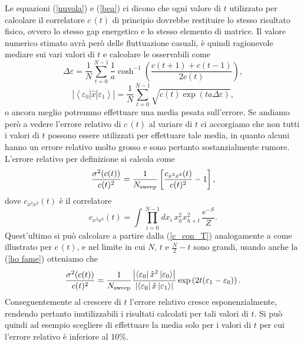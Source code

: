 \documentclass{article}
\begin{document}
Le equazioni (\ref{nuvola}) e (\ref{bea}) ci dicono che ogni valore di $t$ utilizzato per calcolare il correlatore $c\,(t)$ di principio dovrebbe restituire lo stesso risultato fisico, ovvero lo stesso gap energetico e lo stesso elemento di matrice. Il valore numerico stimato avrà però delle fluttuazione casuali, è quindi ragionevole mediare sui vari valori di $t$ e calcolare le osservabili come 
\begin{equation}
    \label{panca piana}
    \Delta\varepsilon=\frac{1}{N}\sum_{t=0}^{N-1}\frac{1}{a}\cosh^{-1}\left(\frac{c(t+1)+c(t-1)}{2c(t)}\right),
\end{equation} 
\begin{equation}
    \label{panca inclinata}
    \left|\left<\varepsilon_0\left|\hat{x}\right|\varepsilon_1\right>\right|=\frac{1}{N}\sum_{t=0}^{N-1}\sqrt{c(t)\exp{\left(ta\Delta\varepsilon\right)}},
\end{equation}
o ancora meglio potremmo effettuare una media pesata sull'errore. 
Se andiamo però a vedere l'errore relativo di $c\,(t)$ al variare di $t$ ci accorgiamo che non tutti i valori di $t$ possono essere utilizzati per effettuare tale media, in quanto alcuni hanno un errore relativo molto grosso e sono pertanto sostanzialmente rumore. L'errore relativo per definizione si calcola come
\begin{equation}
    \frac{\sigma^2(c(t))}{c(t)^2}=\frac{1}{N_{\textup{sweep}}}\left[\frac{c_{x^2x^2}(t)}{c(t)^2}-1\right], 
\end{equation} 
dove $c_{x^2x^2}(t)$ è il correlatore
\begin{equation}
    c_{x^2x^2}(t)=\int \prod_{i=0}^{N-1} dx_i\,x_{h}^2x_{h+t}^2\,\frac{e^{-S}}{Z}.
\end{equation}
Quest'ultimo si può calcolare a partire dalla (\ref{c_con_T}) analogamente a come illustrato per $c\,(t)$, e nel limite in cui $N$, $t$ e $\frac{N}{2}-t$ sono grandi, usando anche la (\ref{ho fame}) otteniamo che 
\begin{equation}
    \frac{\sigma^2(c(t))}{c(t)^2}=\frac{1}{N_{\textup{sweep}}}\frac{  \left|\left<\varepsilon_0\right|\hat{x}^2\left|\varepsilon_0\right>\right|}{  \left|\left<\varepsilon_0\right|\hat{x}\left|\varepsilon_1\right>\right|}\exp\left(2t(\varepsilon_1-\varepsilon_0)\right).
\end{equation}
Conseguentemente al crescere di $t$ l'errore relativo cresce esponenzialmente, rendendo pertanto inutilizzabili i risultati calcolati per tali valori di $t$. Si può quindi ad esempio scegliere di effettuare la media solo per i valori di $t$ per cui l'errore relativo è inferiore al 10\%. 
\end{document}
